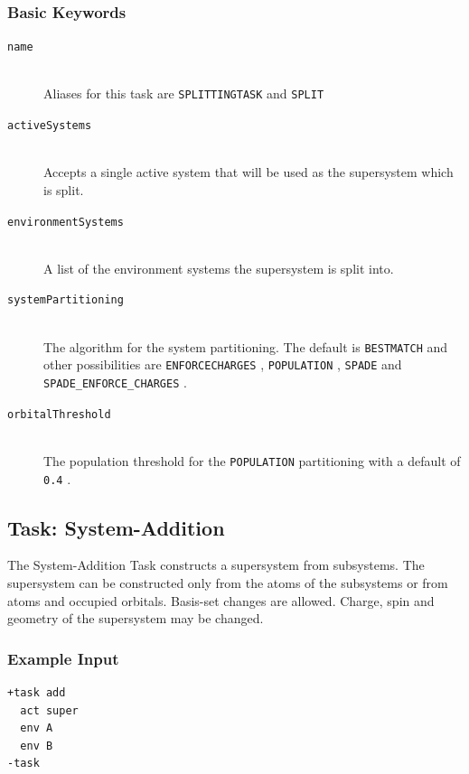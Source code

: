 \documentclass[bibliography=totocnumbered,a4paper,10pt,oneside]{scrbook}
\newcommand{\ttt}[1]{%
  \begingroup\setlength{\fboxsep}{1pt}%
  \colorbox{serenity-green!30}{\texttt{\hspace*{2pt}\vphantom{(g}#1\hspace*{2pt}}}%
  \endgroup
}
\begin{document}
\subsubsection{Basic Keywords}
\begin{description}
	\item[\texttt{name}]\hfill \\
	Aliases for this task are \ttt{SPLITTINGTASK} and \ttt{SPLIT}
	\item[\texttt{activeSystems}]\hfill \\
	Accepts a single active system that will be used as the supersystem which is split.
	\item[\texttt{environmentSystems}]\hfill \\
	A list of the environment systems the supersystem is split into.
	\item[\texttt{systemPartitioning}]\hfill \\
	The algorithm for the system partitioning. The default is \ttt{BESTMATCH} and other possibilities are \ttt{ENFORCECHARGES}, \ttt{POPULATION}, \ttt{SPADE} and  \ttt{SPADE\_ENFORCE\_CHARGES}.
	\item[\texttt{orbitalThreshold}]\hfill \\
	The population threshold for the \ttt{POPULATION} partitioning with a default of \ttt{0.4}.
\end{description}

\subsection{Task: System-Addition}\label{task: addition}
The System-Addition Task constructs a supersystem from subsystems. The supersystem can be constructed only from the atoms of the subsystems or from atoms and occupied orbitals. Basis-set changes are allowed. Charge, spin and geometry of the supersystem may be changed.
\subsubsection{Example Input}
\begin{lstlisting}
+task add
  act super
  env A
  env B
-task
\end{lstlisting}
\end{document}
